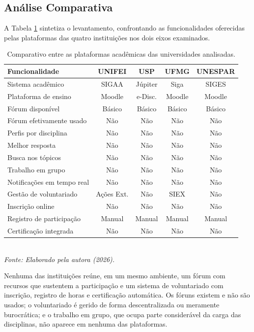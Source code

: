 \subsection{Análise Comparativa}

A Tabela \ref{tab-comparativo} sintetiza o levantamento, confrontando as funcionalidades oferecidas pelas plataformas das quatro instituições nos dois eixos examinados.

\begin{table}[!ht]
\centering
\caption{Comparativo entre as plataformas acadêmicas das universidades analisadas.}
\label{tab-comparativo}
\scriptsize
\begin{tabular}{|l|c|c|c|c|}
\hline
\textbf{Funcionalidade} & \textbf{UNIFEI} & \textbf{USP} & \textbf{UFMG} & \textbf{UNESPAR} \\
\hline
Sistema acadêmico & SIGAA & Júpiter & Siga & SIGES \\
\hline
Plataforma de ensino & Moodle & e-Disc. & Moodle & Moodle \\
\hline
Fórum disponível & Básico & Básico & Básico & Básico \\
\hline
Fórum efetivamente usado & Não & Não & Não & Não \\
\hline
Perfis por disciplina & Não & Não & Não & Não \\
\hline
Melhor resposta & Não & Não & Não & Não \\
\hline
Busca nos tópicos & Não & Não & Não & Não \\
\hline
Trabalho em grupo & Não & Não & Não & Não \\
\hline
Notificações em tempo real & Não & Não & Não & Não \\
\hline
Gestão de voluntariado & Ações Ext. & Não & SIEX & Não \\
\hline
Inscrição online & Não & Não & Não & Não \\
\hline
Registro de participação & Manual & Manual & Manual & Manual \\
\hline
Certificação integrada & Não & Não & Não & Não \\
\hline
\end{tabular}
\\ \vspace{5pt}
\textit{\scriptsize Fonte: Elaborado pela autora (2026).}
\end{table}

Nenhuma das instituições reúne, em um mesmo ambiente, um fórum com recursos que sustentem a participação e um sistema de voluntariado com inscrição, registro de horas e certificação automática. Os fóruns existem e não são usados; o voluntariado é gerido de forma descentralizada ou meramente burocrática; e o trabalho em grupo, que ocupa parte considerável da carga das disciplinas, não aparece em nenhuma das plataformas.

